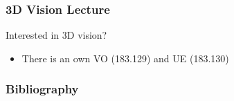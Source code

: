 \documentclass[xetex,professionalfont]{beamer}
\begin{document}

\begin{frame}
\frametitle{3D Vision Lecture}

Interested in 3D vision?
\begin{itemize}
    \item There is an own VO (183.129) and UE (183.130)
\end{itemize}

\end{frame}


\begin{frame}
\frametitle{Bibliography}

\printbibliography

\end{frame}
\end{document}
